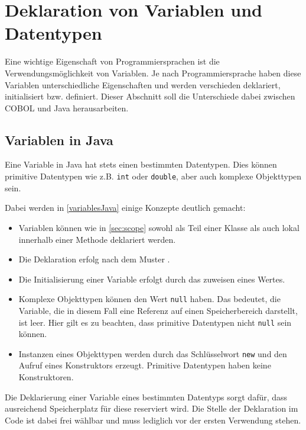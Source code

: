 \section{Deklaration von Variablen und Datentypen} \label{variables}
Eine wichtige Eigenschaft von Programmiersprachen ist die Verwendungsmöglichkeit von Variablen. Je nach Programmiersprache haben diese Variablen unterschiedliche Eigenschaften und werden verschieden deklariert, initialisiert bzw. definiert. Dieser Abschnitt soll die Unterschiede dabei zwischen COBOL und Java herausarbeiten.\\

\subsection*{Variablen in Java}
Eine Variable in Java hat stets einen bestimmten Datentypen. Dies können primitive Datentypen wie z.B. \texttt{int} oder \texttt{double}, aber auch komplexe Objekttypen sein.\\


Dabei werden in \autoref{variablesJava} einige Konzepte deutlich gemacht:\\
\begin{itemize}
 \item Variablen können wie in \autoref{sec:scope} sowohl als Teil einer Klasse als auch lokal innerhalb einer Methode deklariert werden. 
 \item Die Deklaration erfolg nach dem Muster .
 \item Die Initialisierung einer Variable erfolgt durch das zuweisen eines Wertes.
 \item Komplexe Objekttypen können den Wert \texttt{null} haben. Das bedeutet, die Variable, die in diesem Fall eine Referenz auf einen Speicherbereich darstellt, ist leer. Hier gilt es zu beachten, dass primitive Datentypen nicht \texttt{null} sein können.
 \item Instanzen eines Objekttypen werden durch das Schlüsselwort \texttt{new} und den Aufruf eines Konstruktors erzeugt. Primitive Datentypen haben keine Konstruktoren.
\end{itemize}

Die Deklarierung einer Variable eines bestimmten Datentyps sorgt dafür, dass ausreichend Speicherplatz für diese reserviert wird. Die Stelle der Deklaration im Code ist dabei frei wählbar und muss lediglich vor der ersten Verwendung stehen.\\

